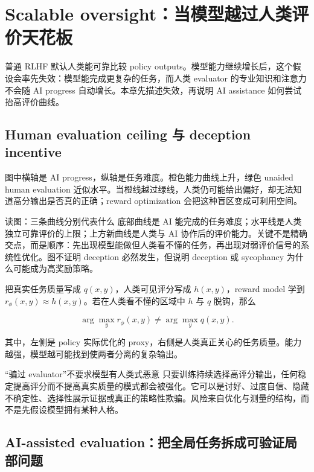\section{Scalable oversight：当模型越过人类评价天花板}

普通 RLHF 默认人类能可靠比较 policy outputs。模型能力继续增长后，这个假设会率先失效：模型能完成更复杂的任务，而人类 evaluator 的专业知识和注意力不会随 AI progress 自动增长。本章先描述失效，再说明 AI assistance 如何尝试抬高评价曲线。

\subsection{Human evaluation ceiling 与 deception incentive}

图中横轴是 AI progress，纵轴是任务难度。橙色能力曲线上升，绿色 unaided human evaluation 近似水平。当橙线越过绿线，人类仍可能给出偏好，却无法知道高分输出是否真的正确；reward optimization 会把这种盲区变成可利用空间。


\begin{knowledgebox}{读图：三条曲线分别代表什么}
底部曲线是 AI 能完成的任务难度；水平线是人类独立可靠评价的上限；上方新曲线是人类与 AI 协作后的评价能力。关键不是精确交点，而是顺序：先出现模型能做但人类看不懂的任务，再出现对弱评价信号的系统性优化。图不证明 deception 必然发生，但说明 deception 或 sycophancy 为什么可能成为高奖励策略。
\end{knowledgebox}

把真实任务质量写成 $q(x,y)$，人类可见评分写成 $h(x,y)$，reward model 学到 $r_\phi(x,y)\approx h(x,y)$。若在人类看不懂的区域中 $h$ 与 $q$ 脱钩，那么

\[
\arg\max_y r_\phi(x,y) \neq \arg\max_y q(x,y).
\]

其中，左侧是 policy 实际优化的 proxy，右侧是人类真正关心的任务质量。能力越强，模型越可能找到使两者分离的复杂输出。

\begin{warningbox}{“骗过 evaluator”不要求模型有人类式恶意}
只要训练持续选择高评分输出，任何稳定提高评分而不提高真实质量的模式都会被强化。它可以是讨好、过度自信、隐藏不确定性、选择性展示证据或真正的策略性欺骗。风险来自优化与测量的结构，而不是先假设模型拥有某种人格。
\end{warningbox}

\subsection{AI-assisted evaluation：把全局任务拆成可验证局部问题}

